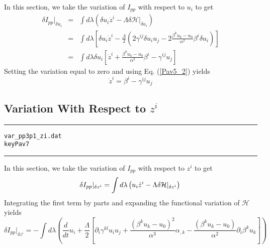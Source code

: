\documentclass[12pt]{article}
\begin{document}
In this section, we take the variation of $ I_{pp} $ with respect to
$ {u}_{i} $ to get
\begin{eqnarray}\label{Pav6_1}
{ \delta I_{pp} } |_{\delta {u}_{i} } & = & \int d \lambda \left( \delta {u}_{i} {\dot z}^{i}
- \Lambda { \delta \mathcal{H} } |_{\delta {u}_{i} } \right) \nonumber \\
& = & \int d \lambda \left[ \delta {u}_{i} {\dot z}^{i}
- \frac{\Lambda}{2} \left(
2 {\gamma}^{i j} \delta {u}_{i} {u}_{j}
- 2
\frac{ {\beta}^{k} {u}_{k} - {u}_{0} }
{ \alpha ^2 } {\beta}^{i} \delta {u}_{i} \right) \right] \nonumber \\
& = & \int d \lambda \delta {u}_{i} \left[ {\dot z}^{i} +
\frac{ {\beta}^{k} {u}_{k} - {u}_{0} }{ \alpha ^2 } {\beta}^{i}
- {\gamma}^{i j} {u}_{j} \right]
\end{eqnarray}
Setting the variation equal to zero and using Eq. (\ref{Pav5_2}) yields
\begin{equation}\label{Pav6_2}
{\dot z}^{i} = {\beta}^{i} - {\gamma}^{i j} {u}_{j}
\end{equation}

\subsection{Variation With Respect to $ z^i $}

\clearpage
\vspace{5mm}
\hrule
\begin{alltt}
  var_pp3p1_zi.dat
  key Pav7
\end{alltt}
\hrule
\vspace{5mm}

In this section, we take the variation of $ I_{pp} $ with
respect to $ {z ^ i} $ to get
\begin{equation}\label{Pav7_1}
{ \delta I_{pp} } |_{\delta {z ^ i} } = \int d \lambda \left( {u}_{i} {\dot z}^{i} - \Lambda { \delta \mathcal{H} } |_{\delta {z ^ i} } \right) \nonumber \\
\end{equation}
Integrating the first term by parts and expanding the functional
variation of $ \mathcal{H} $ yields
\begin{equation}\label{Pav7_2}
{ \delta I_{pp} } |_{\delta {z ^ i} } = - \int d \lambda \left( \frac{ d }{d t} {u}_{i}
+ \frac{\Lambda}{2}
\left[ \partial_{i} {\gamma}^{k l} {u}_{i} {u}_{j}
+ \frac{ \left( {\beta}^{k} {u}_{k} - {u}_{0} \right) ^2 }{ \alpha ^3 } { \alpha }_{ , k }
- \frac{ \left( {\beta}^{k} {u}_{k} - {u}_{0} \right) }{ \alpha ^2 }
\partial_{i} {\beta}^{k} {u}_{k} \right] \right)
\end{equation}
\end{document}
